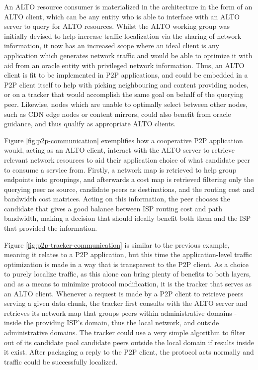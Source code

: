     An ALTO resource consumer is materialized in the architecture in the form of an ALTO client, which can be any entity who is able to interface with an ALTO server to query for ALTO resources.
    Whilst the ALTO working group was initially devised to help increase traffic localization via the sharing of network information, it now has an increased scope where an ideal client is any application which generates network traffic and would be able to optimize it with aid from an oracle entity with privileged network information.
    Thus, an ALTO client is fit to be implemented in P2P applications, and could be embedded in a P2P client itself to help with picking neighbouring and content providing nodes, or on a tracker that would accomplish the same goal on behalf of the querying peer.
    Likewise, nodes which are unable to optimally select between other nodes, such as CDN edge nodes or content mirrors, could also benefit from oracle guidance, and thus qualify as appropriate ALTO clients.

    Figure \ref{fig:p2p-communication} exemplifies how a cooperative P2P application would, acting as an ALTO client, interact with the ALTO server to retrieve relevant network resources to aid their application choice of what candidate peer to consume a service from.
    Firstly, a network map is retrieved to help group endpoints into groupings, and afterwards a cost map is retrieved filtering only the querying peer as source, candidate peers as destinations, and the routing cost and bandwidth cost matrices.
    Acting on this information, the peer chooses the candidate that gives a good balance between ISP routing cost and path bandwidth, making a decision that should ideally benefit both them and the ISP that provided the information.

    Figure \ref{fig:p2p-tracker-communication} is similar to the previous example, meaning it relates to a P2P application, but this time the application-level traffic optimization is made in a way that is transparent to the P2P client.
    As a choice to purely localize traffic, as this alone can bring plenty of benefits to both layers, and as a means to minimize protocol modification, it is the tracker that serves as an ALTO client.
    Whenever a request is made by a P2P client to retrieve peers serving a given data chunk, the tracker first consults with the ALTO server and retrieves its network map that groups peers within administrative domains - inside the providing ISP's domain, thus the local network, and outside administrative domains.
    The tracker could use a very simple algorithm to filter out of its candidate pool candidate peers outside the local domain if results inside it exist.
    After packaging a reply to the P2P client, the protocol acts normally and traffic could be successfully localized.

